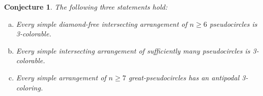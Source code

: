 \documentclass[fontsize=11pt,a4paper,DIV12]{scrartcl}
\newtheorem{conjecture}[theorem]{Conjecture}
\begin{document}
\begin{conjecture}\label{conjecture:strenghened}
The following three statements hold:
  \begin{enumerate}[(a)]
  \item
    \label{conjecture:diamondfree_pwi_chi3}
    Every simple diamond-free intersecting arrangement of $ n \ge 6 $
    pseudocircles is 3-colorable.
  \item
    \label{conjecture:large_pwi_chi3}
    Every simple intersecting arrangement of sufficiently many pseudocircles
    is 3-colorable.
  \item
    \label{conjecture:antipodal3colorable}
    Every simple arrangement of $n \ge 7$ great-pseudocircles has an antipodal
    3-coloring.
  \end{enumerate}
\end{conjecture}

{\small
	
	
}
\end{document}
